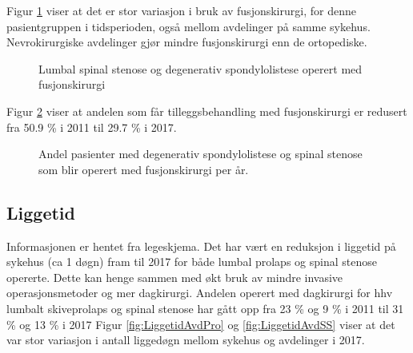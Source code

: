 Figur \ref{fig:degSponFusj} viser at det er stor variasjon i bruk av fusjonskirurgi, 
for denne pasientgruppen i tidsperioden, også mellom avdelinger på samme sykehus. Nevrokirurgiske avdelinger gjør mindre fusjonskirurgi enn de ortopediske.
\begin{figure}[ht]
\caption{\label{fig:degSponFusj} Lumbal spinal stenose og degenerativ spondylolistese operert med fusjonskirurgi}
\end{figure}

Figur \ref{fig:degSponFusjSStid} viser at andelen som får 
tilleggsbehandling med fusjonskirurgi er redusert fra 50.9 \% 
i 2011 til 29.7 \% i 2017.

\begin{figure}[ht]
\caption{\label{fig:degSponFusjSStid} Andel pasienter med degenerativ spondylolistese og spinal stenose som blir operert med fusjonskirurgi per år.}
\end{figure}



\clearpage


\subsection{Liggetid}

Informasjonen er hentet fra legeskjema.
Det har vært en reduksjon i liggetid  på sykehus (ca 1 døgn) fram til 2017 for både lumbal prolaps og spinal stenose opererte. 
Dette kan henge sammen med økt bruk av mindre invasive operasjonsmetoder og mer dagkirurgi. 
Andelen operert med dagkirurgi for hhv lumbalt skiveprolaps og spinal stenose har gått opp fra 
23 \% og 9 \%  i 2011 til 31 \% og 13 \%  i 2017  
Figur \ref{fig:LiggetidAvdPro} og \ref{fig:LiggetidAvdSS} viser at det var stor variasjon i antall liggedøgn mellom sykehus og avdelinger i 2017.


      
      
      


